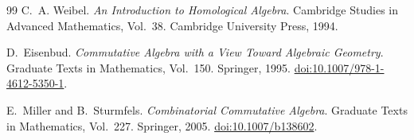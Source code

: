 \documentclass{article}
\newcommand{\<}{\langle}
\renewcommand{\>}{\rangle}
\theoremstyle{definition}
\theoremstyle{remark}
\begin{document}
\begin{thebibliography}{99}
		C.~A. Weibel.
		\newblock \emph{An Introduction to Homological Algebra}.
		\newblock Cambridge Studies in Advanced Mathematics, Vol.~38. Cambridge
		University Press, 1994.
		
		D.~Eisenbud.
		\newblock \emph{Commutative Algebra with a View Toward Algebraic Geometry}.
		\newblock Graduate Texts in Mathematics, Vol.~150. Springer, 1995.
		\newblock \href{https://doi.org/10.1007/978-1-4612-5350-1}{doi:10.1007/978-1-4612-5350-1}.
		
		E.~Miller and B.~Sturmfels.
		\newblock \emph{Combinatorial Commutative Algebra}.
		\newblock Graduate Texts in Mathematics, Vol.~227. Springer, 2005.
		\newblock \href{https://doi.org/10.1007/b138602}{doi:10.1007/b138602}.
		
	\end{thebibliography}
	
	
\end{document}
